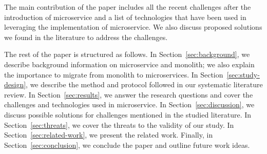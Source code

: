 The main contribution of the paper includes all the recent challenges after the introduction of microservice and a list of technologies that have been used in leveraging the implementation of microservice. We also discuss proposed solutions we found in the literature to address the challenges.

The rest of the paper is structured as follows. In Section~\ref{sec:background}, we describe background information on microservice and monolith; we also explain the importance to migrate from monolith to microservices. In Section~\ref{sec:study-design}, we describe the method and protocol followed in our systematic literature review. In Section~\ref{sec:results}, we answer the research questions and cover the challenges and technologies used in microservice. In Section~\ref{sec:discussion}, we discuss possible solutions for challenges mentioned in the studied literature. In Section~\ref{sec:threats}, we cover the threats to the validity of our study. In Section~\ref{sec:related-work}, we present the related work. Finally, in Section~\ref{sec:conclusion}, we conclude the paper and outline future work ideas.



